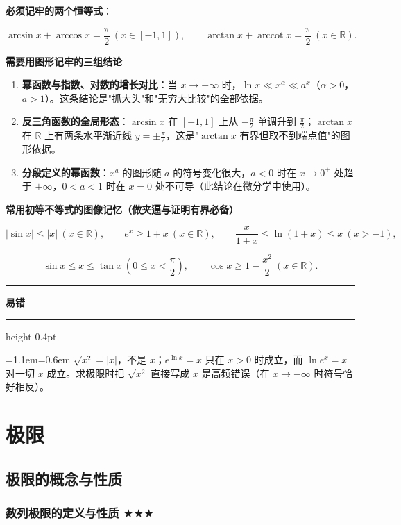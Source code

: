 \documentclass[11pt,openany,UTF8]{ctexbook}
\newcommand{\callouthead}[2]{%
  \par\addvspace{7pt}\noindent
  {\color{#1}\rule[-0.15em]{3pt}{1.05em}}\hspace{0.5em}%
  {\bfseries\color{#1}#2}\par\nobreak\vspace{-0.35em}%
  {\color{rulesep}\hrule height 0.4pt}\nobreak\vspace{0.45em}%
  \begingroup\small\setlength{\parindent}{0pt}%
  \leftskip=1.1em\rightskip=0.6em\noindent\ignorespaces}
\newcommand{\calloutend}{\par\endgroup\addvspace{7pt}}
\newenvironment{callwarn}[1]{\callouthead{warnbar}{#1}}{\calloutend}
\begin{document}
\textbf{必须记牢的两个恒等式}：

\[\arcsin x+\arccos x=\frac{\pi}{2}\ (x\in[-1,1]),\qquad \arctan x+\operatorname{arccot} x=\frac{\pi}{2}\ (x\in\mathbb{R}).\]

\textbf{需要用图形记牢的三组结论}

\begin{enumerate}
\item \textbf{幂函数与指数、对数的增长对比}：当 $x\to+\infty$ 时，$\ln x\ll x^{\alpha}\ll a^{x}$（$\alpha>0$，$a>1$）。这条结论是"抓大头"和"无穷大比较"的全部依据。
\item \textbf{反三角函数的全局形态}：$\arcsin x$ 在 $[-1,1]$ 上从 $-\frac{\pi}{2}$ 单调升到 $\frac{\pi}{2}$；$\arctan x$ 在 $\mathbb{R}$ 上有两条水平渐近线 $y=\pm\frac{\pi}{2}$，这是"$\arctan x$ 有界但取不到端点值"的图形依据。
\item \textbf{分段定义的幂函数}：$x^{a}$ 的图形随 $a$ 的符号变化很大，$a<0$ 时在 $x\to 0^+$ 处趋于 $+\infty$，$0<a<1$ 时在 $x=0$ 处不可导（此结论在微分学中使用）。
\end{enumerate}
\textbf{常用初等不等式的图像记忆（做夹逼与证明有界必备）}

\[\vert\sin x\vert\le\vert x\vert\ (x\in\mathbb{R}),\qquad e^{x}\ge 1+x\ (x\in\mathbb{R}),\qquad \frac{x}{1+x}\le\ln(1+x)\le x\ (x>-1),\]

\[\sin x\le x\le\tan x\ \left(0\le x<\frac{\pi}{2}\right),\qquad \cos x\ge 1-\frac{x^{2}}{2}\ (x\in\mathbb{R}).\]

\begin{callwarn}{易错}
$\sqrt{x^2}=\vert x\vert$，不是 $x$；$e^{\ln x}=x$ 只在 $x>0$ 时成立，而 $\ln e^x=x$ 对一切 $x$ 成立。求极限时把 $\sqrt{x^2}$ 直接写成 $x$ 是高频错误（在 $x\to-\infty$ 时符号恰好相反）。

\end{callwarn}

\section{极限}

\subsection{极限的概念与性质}

\subsubsection{数列极限的定义与性质 $\bigstar$$\bigstar$$\bigstar$}
\end{document}
